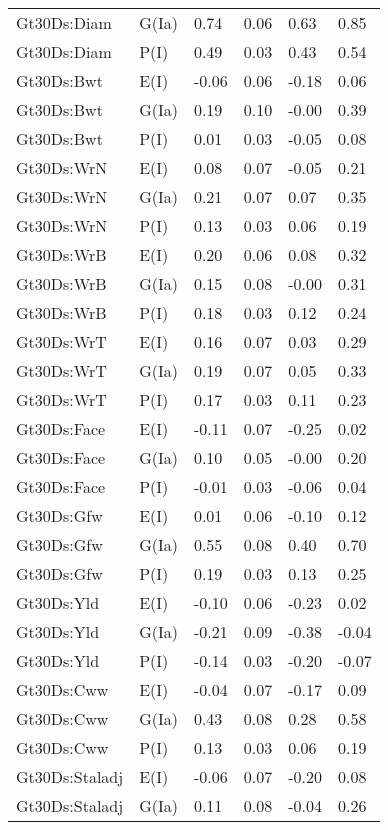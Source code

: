\begin{center}
\begin{longtable}{|p{1.1in}|p{0.7in}|p{0.7in}|p{0.6in}|p{0.6in}|p{0.6in}|}
  Gt30Ds:Diam & G(Ia) & 0.74 & 0.06 & 0.63 & 0.85 \\ 
  Gt30Ds:Diam & P(I) & 0.49 & 0.03 & 0.43 & 0.54 \\ 
  Gt30Ds:Bwt & E(I) & -0.06 & 0.06 & -0.18 & 0.06 \\ 
  Gt30Ds:Bwt & G(Ia) & 0.19 & 0.10 & -0.00 & 0.39 \\ 
  Gt30Ds:Bwt & P(I) & 0.01 & 0.03 & -0.05 & 0.08 \\ 
  Gt30Ds:WrN & E(I) & 0.08 & 0.07 & -0.05 & 0.21 \\ 
  Gt30Ds:WrN & G(Ia) & 0.21 & 0.07 & 0.07 & 0.35 \\ 
  Gt30Ds:WrN & P(I) & 0.13 & 0.03 & 0.06 & 0.19 \\ 
  Gt30Ds:WrB & E(I) & 0.20 & 0.06 & 0.08 & 0.32 \\ 
  Gt30Ds:WrB & G(Ia) & 0.15 & 0.08 & -0.00 & 0.31 \\ 
  Gt30Ds:WrB & P(I) & 0.18 & 0.03 & 0.12 & 0.24 \\ 
  Gt30Ds:WrT & E(I) & 0.16 & 0.07 & 0.03 & 0.29 \\ 
  Gt30Ds:WrT & G(Ia) & 0.19 & 0.07 & 0.05 & 0.33 \\ 
  Gt30Ds:WrT & P(I) & 0.17 & 0.03 & 0.11 & 0.23 \\ 
  Gt30Ds:Face & E(I) & -0.11 & 0.07 & -0.25 & 0.02 \\ 
  Gt30Ds:Face & G(Ia) & 0.10 & 0.05 & -0.00 & 0.20 \\ 
  Gt30Ds:Face & P(I) & -0.01 & 0.03 & -0.06 & 0.04 \\ 
  Gt30Ds:Gfw & E(I) & 0.01 & 0.06 & -0.10 & 0.12 \\ 
  Gt30Ds:Gfw & G(Ia) & 0.55 & 0.08 & 0.40 & 0.70 \\ 
  Gt30Ds:Gfw & P(I) & 0.19 & 0.03 & 0.13 & 0.25 \\ 
  Gt30Ds:Yld & E(I) & -0.10 & 0.06 & -0.23 & 0.02 \\ 
  Gt30Ds:Yld & G(Ia) & -0.21 & 0.09 & -0.38 & -0.04 \\ 
  Gt30Ds:Yld & P(I) & -0.14 & 0.03 & -0.20 & -0.07 \\ 
  Gt30Ds:Cww & E(I) & -0.04 & 0.07 & -0.17 & 0.09 \\ 
  Gt30Ds:Cww & G(Ia) & 0.43 & 0.08 & 0.28 & 0.58 \\ 
  Gt30Ds:Cww & P(I) & 0.13 & 0.03 & 0.06 & 0.19 \\ 
  Gt30Ds:Staladj & E(I) & -0.06 & 0.07 & -0.20 & 0.08 \\ 
  Gt30Ds:Staladj & G(Ia) & 0.11 & 0.08 & -0.04 & 0.26 \\ 

\end{longtable}
\end{center}
